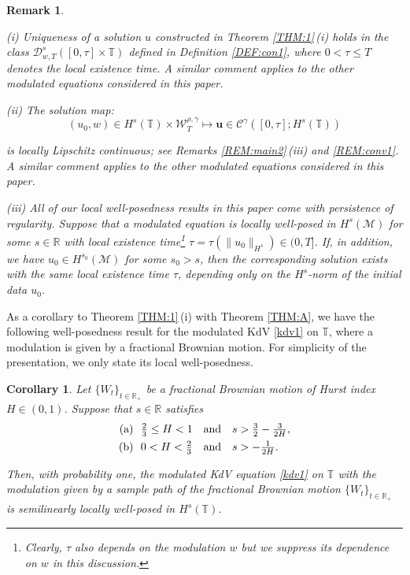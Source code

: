 \documentclass[letterpaper, 11pt,  reqno]{amsart}
\newtheorem{remark}[theorem]{Remark}
\newtheorem{corollary}[theorem]{Corollary}
\newcommand{\1}{\hspace{0.5mm}\text{I}\hspace{0.5mm}}
\newcommand{\noi}{\noindent}
\newcommand{\R}{\mathbb{R}}
\newcommand{\T}{\mathbb{T}}
\newcommand{\g}{\gamma}
\newcommand{\M}{\mathcal{M}}
\newcommand{\cC}{\mathcal{C}}
\newcommand{\cD}{\mathscr{D}}
\newcommand{\W}{\mathcal{W}}
\newcommand{\uu}{\mathbf{u}}
\numberwithin{equation}{section}
\numberwithin{theorem}{section}
\begin{document}
\begin{remark}\label{REM:pers1}\rm

(i)
Uniqueness of a solution $u$ constructed in Theorem \ref{THM:1}\,(i)
holds 
 in the class $\cD_{w,T}^s([0, \tau] \times \T)$
 defined in Definition \ref{DEF:con1}, 
 where 
 $0 < \tau \le  T$ denotes the local existence time.
A similar comment applies to the other modulated equations
considered in this paper. 



\smallskip


\noi 
(ii)
The solution map:
 \[(u_0, w) \in H^s(\T) 
\times  \W^{\rho,\g}_T \longmapsto \uu \in \cC^\g([0, \tau]; H^s(\T))\]

\noi
is locally Lipschitz continuous;
see Remarks \ref{REM:main2}\,(iii) and \ref{REM:conv1}.
A similar comment applies to the other modulated equations
considered in this paper. 

\smallskip

\noi
(iii) All of our local well-posedness results
in this paper
come with {\it persistence of regularity}.
Suppose that  a modulated equation is locally well-posed
in $H^{s}(\M)$ for some $s \in \R$
with local existence time\footnote{Clearly, $\tau$ also depends
on the modulation $w$ but we suppress its dependence on $w$
in this discussion.}
 $\tau = \tau(\|u_0\|_{H^{s}}) \in (0, T]$.
If, in addition, we have $u_0 \in H^{s_0}(\M)$
for some $s_0 > s$, 
then the corresponding solution exists
with the same local existence time $\tau$, 
depending only on the $H^s$-norm of the initial data $u_0$.



\end{remark}



As a corollary to Theorem \ref{THM:1}\,(i)
with Theorem \ref{THM:A}, we have
the following well-posedness
result for the modulated KdV \eqref{kdv1} on $\T$, 
where a modulation is given by a fractional Brownian motion.
For simplicity of the presentation, 
we only state its local well-posedness.


\begin{corollary}\label{COR:1}
Let $\{W_t\}_{t\in \R_+}$ be a fractional Brownian motion 
of Hurst index $H\in(0,1)$.
Suppose that $s \in \R$ satisfies 
\begin{align*}
\textup{(a)} &\ \  \tfrac 23 \le H  <1 \quad \text{and} \quad 
s > \tfrac 32 - \tfrac{3}{2H} , \\
\textup{(b)} &\ \  0 < H < \tfrac 23\quad  \text{and} \quad  s > - \tfrac 1{2H}.
\end{align*}

\noi
Then, 
with probability one, 
the modulated KdV equation \eqref{kdv1}
on  $\T$
with the modulation given by 
a sample path of the
 fractional Brownian motion 
 $\{W_t\}_{t\in \R_+}$
is semilinearly locally well-posed in $H^s(\T)$.



\end{corollary}
\end{document}
